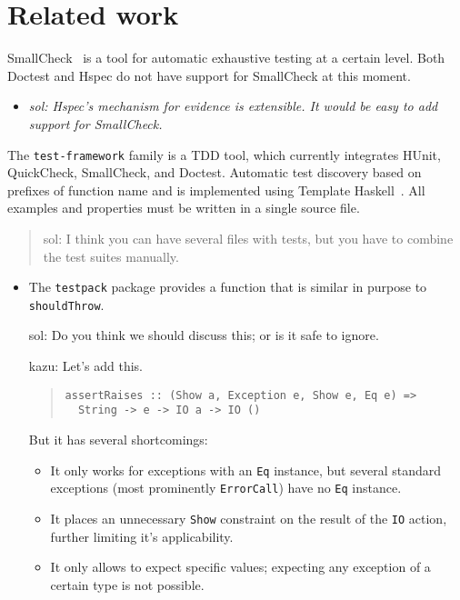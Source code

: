 \documentclass[preprint]{sigplanconf}
\begin{document}
\section{Related work}

SmallCheck~\cite{smallcheck} is a tool for
automatic exhaustive testing at a certain level.
Both Doctest and Hspec do not have support for SmallCheck
at this moment.
\begin{itemize}
    \item
        \emph{sol: Hspec's mechanism for evidence is extensible.  It
        would be easy to add support for SmallCheck.}
\end{itemize}

The {\tt test-framework} family is a TDD tool,
which currently integrates HUnit, QuickCheck, SmallCheck, and Doctest.
Automatic test discovery based on prefixes of function name
and is implemented using Template Haskell~\cite{template-haskell}.
All examples and properties must be written in a single
source file.

\begin{quote}
    sol: I think you can have several files with tests, but you have
    to combine the test suites manually.
\end{quote}


\begin{itemize}
    \item The {\tt testpack} package provides a function that is
        similar in purpose to {\tt shouldThrow}.

        sol: Do you think we should discuss this; or is it safe to
        ignore.

        kazu: Let's add this.

\begin{quote}\small\begin{verbatim}
assertRaises :: (Show a, Exception e, Show e, Eq e) =>
  String -> e -> IO a -> IO ()
\end{verbatim}\end{quote}
        But it has several shortcomings:
        \begin{itemize}
            \item
                It only works for exceptions with an {\tt Eq}
                instance, but several standard exceptions (most
                prominently {\tt ErrorCall}) have no {\tt Eq}
                instance.
            \item
                It places an unnecessary {\tt Show} constraint on the
                result of the {\tt IO} action, further limiting it's
                applicability.
            \item
                It only allows to expect specific values; expecting
                any exception of a certain type is not possible.
        \end{itemize}
\end{itemize}
\end{document}
